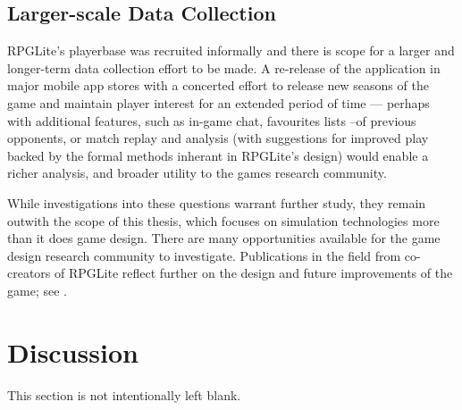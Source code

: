 \subsection{Larger-scale Data Collection}
RPGLite's playerbase was recruited informally and there is scope for a larger
and longer-term data collection effort to be made. A re-release of the
application in major mobile app stores with a concerted effort to release new
seasons of the game and maintain player interest for an extended period of time
--- perhaps with additional features, such as in-game chat, favourites lists
--of previous opponents, or match replay and analysis (with suggestions for
improved play backed by the formal methods inherant in RPGLite's design) would
enable a richer analysis, and broader utility to the games research community.

While investigations into these questions warrant further study, they remain
outwith the scope of this thesis, which focuses on simulation technologies more
than it does game design. There are many opportunities available for the game
design research community to investigate. Publications in the field from
co-creators of RPGLite reflect further on the design and future improvements of
the game; see .


\section{Discussion}\label{sec:future_work_conclusion}

This section is not intentionally left blank.

